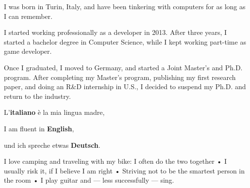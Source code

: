 


I was born in Turin, Italy, and have been tinkering with computers for as long as
I can remember. 

I started working professionally as a developer in 2013. After three years, I started a bachelor degree in Computer Science, while I kept working part-time as game developer.

Once I graduated, I moved to Germany, and started a Joint Master's and Ph.D. program. 
After completing my Master's program, publishing my first research paper, and doing an R\&D internship in U.S., I decided to suspend my Ph.D. and return to the industry.


L'\textbf{italiano} è la mia lingua madre,

I am fluent in \textbf{English},

und ich spreche etwas \textbf{Deutsch}.


I love camping and traveling with my bike: I often do the two together • I usually risk it, if I believe I am right • Striving not to be the smartest person in the room • I play guitar and --- less successfully --- sing.